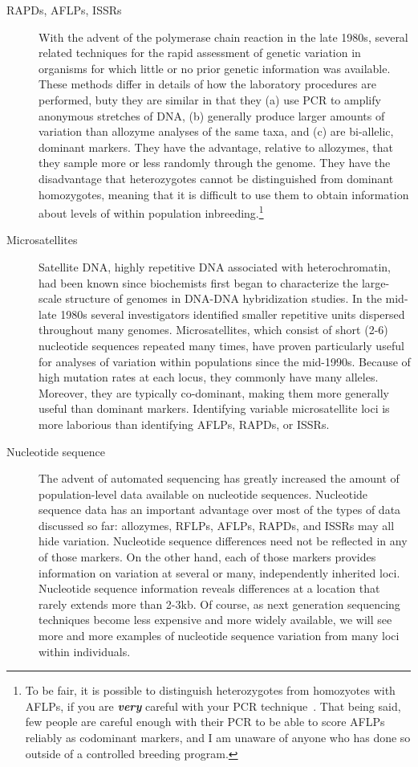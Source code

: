 \documentclass[12pt]{article}
\begin{document}
\begin{description}
\item[RAPDs, AFLPs, ISSRs] With the advent of the polymerase chain
  reaction in the late 1980s, several related techniques for the rapid
  assessment of genetic variation in organisms for which little or no
  prior genetic information was available. These methods differ in
  details of how the laboratory procedures are performed, buty they
  are similar in that they (a) use PCR to amplify anonymous stretches
  of DNA, (b) generally produce larger amounts of variation than
  allozyme analyses of the same taxa, and (c) are bi-allelic, dominant
  markers. They have the advantage, relative to allozymes, that they
  sample more or less randomly through the genome. They have the
  disadvantage that heterozygotes cannot be distinguished from
  dominant homozygotes, meaning that it is difficult to use them to
  obtain information about levels of within population
  inbreeding.\footnote{To be fair, it is possible to distinguish
    heterozygotes from homozyotes with AFLPs, if you are {\it\bf
      very\/} careful with your PCR
    technique~\cite{Jansen-etal-2001}. That being said, few people are
    careful enough with their PCR to be able to score AFLPs reliably
    as codominant markers, and I am unaware of anyone who has done so
    outside of a controlled breeding program.}

\item[Microsatellites] Satellite DNA, highly repetitive DNA associated
  with heterochromatin, had been known since biochemists first began
  to characterize the large-scale structure of genomes in DNA-DNA
  hybridization studies. In the mid-late 1980s several investigators
  identified smaller repetitive units dispersed throughout many
  genomes. Microsatellites, which consist of short (2-6) nucleotide
  sequences repeated many times, have proven particularly useful for
  analyses of variation within populations since the
  mid-1990s. Because of high mutation rates at each locus, they
  commonly have many alleles. Moreover, they are typically
  co-dominant, making them more generally useful than dominant
  markers. Identifying variable microsatellite loci is more laborious
  than identifying AFLPs, RAPDs, or ISSRs.

\item[Nucleotide sequence] The advent of automated sequencing has
  greatly increased the amount of population-level data available on
  nucleotide sequences. Nucleotide sequence data has an important
  advantage over most of the types of data discussed so far:
  allozymes, RFLPs, AFLPs, RAPDs, and ISSRs may all hide
  variation. Nucleotide sequence differences need not be reflected in
  any of those markers. On the other hand, each of those markers
  provides information on variation at several or many, independently
  inherited loci. Nucleotide sequence information reveals differences
  at a location that rarely extends more than 2-3kb. Of course, as
  next generation sequencing techniques become less expensive and more
  widely available, we will see more and more examples of nucleotide
  sequence variation from many loci within individuals.


\end{description}
\end{document}
